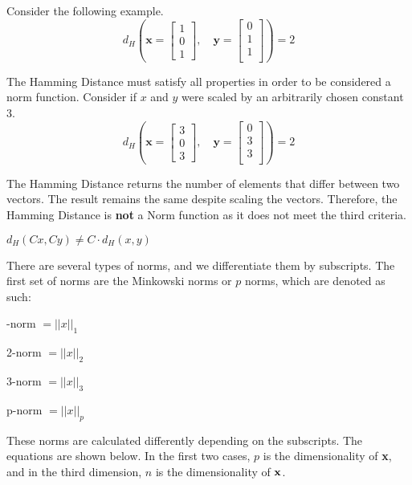 Consider the following example.
\[
d_H \left( \mathbf{{x}} = 
\begin{bmatrix}
    1 \\
    0 \\
    1 
\end{bmatrix}, 
\quad
\mathbf{{y}} = 
\begin{bmatrix}
    0 \\
    1 \\
    1 \\
\end{bmatrix} \right) = 2
\]

The Hamming Distance must satisfy all properties in order to be considered a norm function. Consider if $x$ and $y$ were scaled by an arbitrarily chosen constant $3$.
\[
d_H \left( \mathbf{{x}} = 
\begin{bmatrix}
    3 \\
    0 \\
    3 
\end{bmatrix}, 
\quad
\mathbf{{y}} = 
\begin{bmatrix}
    0 \\
    3 \\
    3 \\
\end{bmatrix} \right) = 2
\]

The Hamming Distance returns the number of elements that differ between two vectors. The result remains the same despite scaling the vectors. Therefore, the Hamming Distance is \textbf{not} a Norm function as it does not meet the third criteria.

\centering
$d_{H}(Cx,Cy) \ne C \cdot d_{H}(x,y)$

\raggedright

There are several types of norms, and we differentiate them by subscripts. The first set of norms are the Minkowski norms or $p$ norms, which are denoted as such:

-norm $= ||x||_1$

2-norm $= ||x||_2$

3-norm $= ||x||_3$

p-norm $= ||x||_p$

\raggedright

These norms are calculated differently depending on the subscripts. The equations are shown below. In the first two cases, $p$ is the dimensionality of {\bf x}, and in the third dimension, $n$ is the dimensionality of ${\bf x}$.

